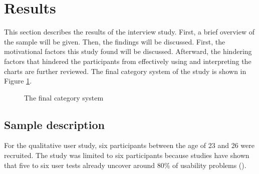 \section{Results}
This section describes the results of the interview study. First, a brief overview of the sample will be given. Then, the findings will be discussed. First, the motivational factors this study found will be discussed. Afterward, the hindering factors that hindered the participants from effectively using and interpreting the charts are further reviewed. The final category system of the study is shown in Figure \ref{fig:category_system}.

\begin{figure}[htb!]
    \centering
    \caption{The final category system}
    \label{fig:category_system}
\end{figure}

\subsection{Sample description}
For the qualitative user study, six participants between the age of 23 and 26 were recruited. The study was limited to six participants because studies have shown that five to six user tests already uncover around 80\% of usability problems (\cite{10.1145/169059.169166}).

